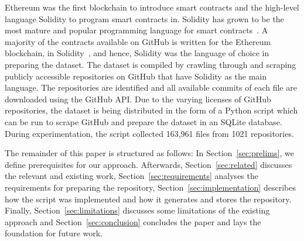 \documentclass[10pt,conference]{IEEEtran}
\begin{document}
	Ethereum was the first blockchain to introduce smart contracts and the high-level language Solidity to program smart contracts in. Solidity has grown to be the most mature and popular programming language for smart contracts~\cite{soliditycheck}. A majority of the contracts available on GitHub is written for the Ethereum blockchain, in Solidity~\cite{empiricalgithubcontracts}, and hence, Solidity was the language of choice in preparing the dataset.  The dataset is compiled by crawling through and scraping publicly accessible repositories on GitHub that have Solidity as the main language. The repositories are identified and all available commits of each file are downloaded using the GitHub API. Due to the varying licenses of GitHub repositories, the dataset is being distributed in the form of a Python script which can be run to scrape GitHub and prepare the dataset in an SQLite database. During experimentation, the script collected 163,961 files from 1021 repositories.
	
	The remainder of this paper is structured as follows: In Section~\ref{sec:prelims}, we define  prerequisites for our approach. 	Afterwards, Section~\ref{sec:related} discusses the relevant and existing work, Section~\ref{sec:requirements} analyses the requirements for preparing the repository, Section~\ref{sec:implementation} describes how the script was implemented and how it generates and stores the repository. Finally, Section~\ref{sec:limitations} discusses some limitations of the existing approach and Section~\ref{sec:conclusion} concludes the paper and lays the foundation for future work.
	
\end{document}
